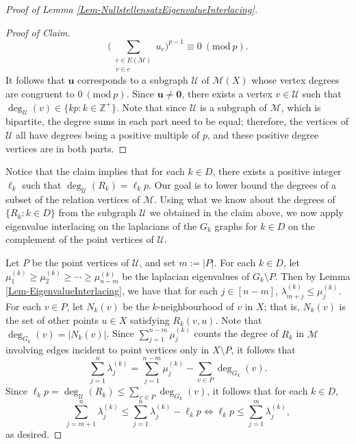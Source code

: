 \documentclass[12pt]{article}
\newcommand{\Z}{\mathbb{Z}}
\newcommand{\Mod}[1]{\ (\mathrm{mod}\ #1)}
\theoremstyle{definition}
\begin{document}
\begin{proof}[Proof of Lemma \ref{Lem-NullstellensatzEigenvalueInterlacing}]
\begin{proof}[Proof of Claim]
				$$\Big(\sum_{\substack{e \in E(\mathcal{M})\\ v \in e}}u_e \Big)^{p-1} \equiv 0 \Mod{p}.$$  
				It follows that $\mathbf{u}$ corresponds to a subgraph $\mathcal{U}$ of $\mathcal{M}(X)$ whose vertex degrees are congruent to $0 \Mod{p}$.  Since $\mathbf{u} \neq \mathbf{0}$, there exists a vertex $v \in \mathcal{U}$ such that $\deg_{\mathcal{U}}(v) \in \{kp: k \in \Z^+\}$.  Note that since $\mathcal{U}$ is a subgraph of $\mathcal{M}$, which is bipartite, the degree sums in each part need to be equal; therefore, the vertices of $\mathcal{U}$ all have degrees being a positive multiple of $p$, and these positive degree vertices are in both parts. \qedhere
			\end{proof}
		Notice that the claim implies that for each $k \in D$, there exists a positive integer $\ell_k$ such that $\deg_{\mathcal{U}}(R_k) = \ell_k p$.  Our goal is to lower bound the degrees of a subset of the relation vertices of $\mathcal{M}$.  Using what we know about the degrees of $\{R_k: k \in D\}$ from the subgraph $\mathcal{U}$ we obtained in the claim above, we now apply eigenvalue interlacing on the laplacians of the $G_k$ graphs for $k \in D$ on the complement of the point vertices of $\mathcal{U}$.
		
		Let $P$ be the point vertices of $\mathcal{U}$, and set $m := |P|$.  For each $k \in D$, let $\mu_{1}^{(k)} \geq \mu_2^{(k)} \geq \cdots \geq \mu_{n-m}^{(k)}$ be the laplacian eigenvalues of $G_k \setminus P$.  Then by Lemma \ref{Lem-EigenvalueInterlacing}, we have that for each $j \in [n-m]$, $\lambda_{m+j}^{(k)} \leq \mu_j^{(k)}$.  For each $v \in P$, let $N_k(v)$ be the $k$-neighbourhood of $v$ in $X$; that is, $N_k(v)$ is the set of other points $u \in X$ satisfying $R_k(v,u)$.  Note that $\deg_{G_k}(v) = |N_k(v)|$.  Since $\sum_{j=1}^{n-m} \mu_j^{(k)}$ counts the degree of $R_k$ in $\mathcal{M}$ involving edges incident to point vertices only in $X \setminus P$, it follows that
		$$\sum_{j=1}^n \lambda_{j}^{(k)} = \sum_{j=1}^{n-m} \mu_j^{(k)} - \sum_{v \in P} \deg_{G_k}(v).$$
		Since $\ell_k p = \deg_{\mathcal{U}}(R_k) \leq \sum_{v\in P} \deg_{G_k}(v)$, it follows that for each $k \in D$,
		$$\sum_{j=m+1}^n \lambda_j^{(k)} \leq \sum_{j=1}^n \lambda_j^{(k)} - \ell_kp \Leftrightarrow \ell_k p \leq \sum_{j=1}^m \lambda_j^{(k)},$$
		as desired.
	\end{proof}
	
	
	
\end{document}
